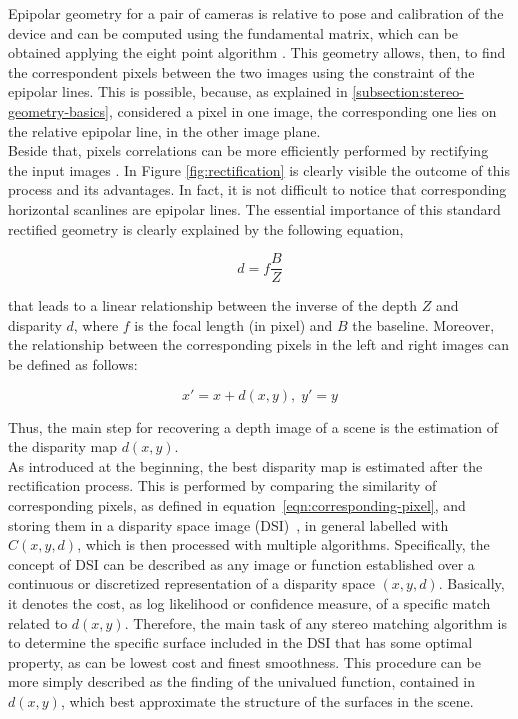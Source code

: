 Epipolar geometry for a pair of cameras is relative to pose and calibration of the device and can be computed using the fundamental matrix, which can be obtained applying the eight point algorithm \cite{hartley2004multiple}.
This geometry allows, then, to find the correspondent pixels between the two images using the constraint of the epipolar lines.
This is possible, because, as explained in \ref{subsection:stereo-geometry-basics}, considered a pixel in one image, the corresponding one lies on the relative epipolar line, in the other image plane.\\
Beside that, pixels correlations can be more efficiently performed by rectifying the input images \cite{hartley2004multiple}.
In Figure \ref{fig:rectification} is clearly visible the outcome of this process and its advantages.
In fact, it is not difficult to notice that corresponding horizontal scanlines are epipolar lines. 
The essential importance of this standard rectified geometry is clearly explained by the following equation,

\begin{equation} 
\label{eqn:disparity-depth}
	d = f \frac{B}{Z}
\end{equation}

that leads to a linear relationship between the inverse of the depth $Z$ and disparity $d$, where $f$ is the focal length (in pixel) and $B$ the baseline.
Moreover, the relationship between the corresponding pixels in the left and right images can be defined as follows:

\begin{equation} 
\label{eqn:corresponding-pixel}
	x' = x + d(x, y), \; y' = y
\end{equation}

Thus, the main step for recovering a depth image of a scene is the estimation of the disparity map $d(x,y)$.\\
As introduced at the beginning, the best disparity map is estimated after the rectification process. 
This is performed by comparing the similarity of corresponding pixels, as defined in equation~\ref{eqn:corresponding-pixel}, and storing them in a disparity space image (DSI)~\cite{yang1993local}, in general labelled with $C(x,y,d)$, which is then processed with multiple algorithms. 
Specifically, the concept of DSI can be described as any image or function established over a continuous or discretized representation of a disparity space $(x, y, d)$.
Basically, it denotes the cost, as log likelihood or confidence measure, of a specific match related to $d(x, y)$.
Therefore, the main task of any stereo matching algorithm is to determine the specific surface included in the DSI that has some optimal property, as can be lowest cost and finest smoothness.
This procedure can be more simply described as the finding of the univalued function, contained in $d(x, y)$, which best approximate the structure of the surfaces in the scene.

